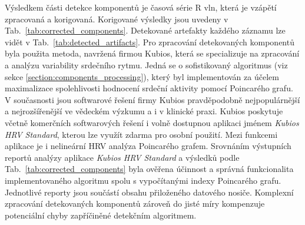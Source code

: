 Výsledkem části detekce komponentů je časová série R vln, která je vzápětí
zpracovaná a korigovaná. Korigované výsledky jsou uvedeny v
Tab.~\ref{tab:corrected_components}. Detekované artefakty každého záznamu lze
vidět v Tab.~\ref{tab:detected_artifacts}. Pro zpracování detekovaných
komponentů byla použita metoda, navržená firmou Kubios, která se specializuje na
zpracování a analýzu variability srdečního rytmu. Jedná se o sofistikovaný
algoritmus (viz sekce \ref{section:components_processing}), který byl
implementován za účelem maximalizace spolehlivosti hodnocení srdeční aktivity
pomocí Poincarého grafu. V současnosti jsou softwarové řešení firmy Kubios
pravděpodobně nejpopulárnější a nejrozšířenější ve vědeckém výzkumu a i v
klinické praxi. Kubios poskytuje včetně komerčních softwarových řešení i volně
dostupnou aplikaci jménem \textit{Kubios HRV Standard}, kterou lze využít zdarma
pro osobní použití. Mezi funkcemi aplikace je i nelineární HRV analýza
Poincarého grafem. Srovnáním výstupních reportů analýzy aplikace \textit{Kubios
HRV Standard} a výsledků podle Tab.~\ref{tab:corrected_components} byla ověřena
účinnost a správná funkcionalita implementovaného algoritmu spolu s vypočítanými
indexy Poincarého grafu. Jednotlivé reporty jsou součástí obsahu přiloženého
datového nosiče. Komplexní zpracování detekovaných komponentů zároveň do jisté
míry kompenzuje potenciální chyby zapříčiněné detekčním algoritmem. 











